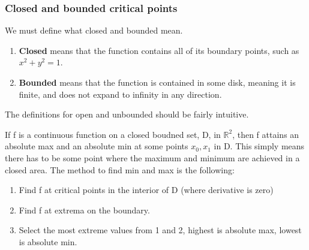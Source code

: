 \documentclass{article}
\begin{document}
\subsubsection{Closed and bounded critical points}
We must define what closed and bounded mean.
\begin{enumerate}
  \item \textbf{Closed} means that the function contains all of its boundary points, such as $x^2 + y^2 = 1$.
  \item \textbf{Bounded} means that the function is contained in some disk, meaning it is finite, and does not expand to infinity in any direction.
\end{enumerate}
The definitions for open and unbounded should be fairly intuitive.\newline

If f is a continuous function on a closed boudned set, D, in $\mathbb{R}^2$, then f attains an absolute max and an absolute min at some points $x_0 , x_1$ in D. This simply means there has to be some point where the maximum and minimum are achieved in a closed area.\newline
The method to find min and max is the following:
\begin{enumerate}
  \item Find f at critical points in the interior of D (where derivative is zero)
  \item Find f at extrema on the boundary.
  \item Select the most extreme values from 1 and 2, highest is absolute max, lowest is absolute min.
\end{enumerate}
\end{document}
